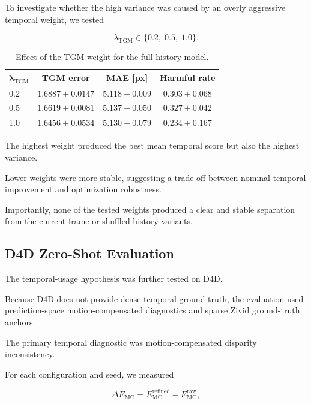 \documentclass[11pt,a4paper]{article}
\begin{document}
To investigate whether the high variance was caused by an overly aggressive
temporal weight, we tested

\begin{equation}
\lambda_{\mathrm{TGM}}
\in
\{0.2,\;0.5,\;1.0\}.
\end{equation}

\begin{table}[h]
\centering
\caption{Effect of the TGM weight for the full-history model.}
\small
\begin{tabular}{lccc}
\toprule
$\boldsymbol{\lambda_{\mathrm{TGM}}}$
& \textbf{TGM error}
& \textbf{MAE [px]}
& \textbf{Harmful rate} \\
\midrule
0.2
& $1.6887 \pm 0.0147$
& $5.118 \pm 0.009$
& $0.303 \pm 0.068$ \\

0.5
& $1.6619 \pm 0.0081$
& $5.137 \pm 0.050$
& $0.327 \pm 0.042$ \\

1.0
& $1.6456 \pm 0.0534$
& $5.130 \pm 0.079$
& $0.234 \pm 0.167$ \\
\bottomrule
\end{tabular}
\end{table}

The highest weight produced the best mean temporal score but also the highest
variance.

Lower weights were more stable, suggesting a trade-off between nominal temporal
improvement and optimization robustness.

Importantly, none of the tested weights produced a clear and stable separation from
the current-frame or shuffled-history variants.

\subsection{D4D Zero-Shot Evaluation}

The temporal-usage hypothesis was further tested on D4D.

Because D4D does not provide dense temporal ground truth, the evaluation used
prediction-space motion-compensated diagnostics and sparse Zivid ground-truth
anchors.

The primary temporal diagnostic was motion-compensated disparity inconsistency.

For each configuration and seed, we measured

\begin{equation}
\Delta E_{\mathrm{MC}}
=
E_{\mathrm{MC}}^{\mathrm{refined}}
-
E_{\mathrm{MC}}^{\mathrm{raw}},
\end{equation}
\end{document}
